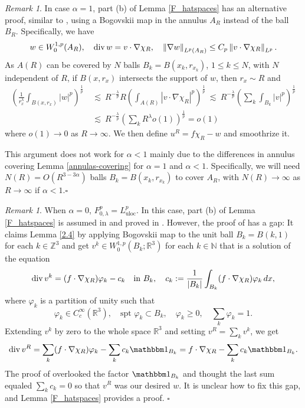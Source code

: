 \documentclass[11pt]{article}
\numberwithin{equation}{section}
\theoremstyle{remark}
\newtheorem{remark}[thm]{Remark}
\theoremstyle{definition}
\newcommand{\bke}[1]{\left ( #1 \right )}
\newcommand{\norm}[1]{\left \| #1 \right \|}
\newcommand{\R}{\mathbb{R}}
\renewcommand{\div}{\mathop{\rm div}\nolimits}
\newcommand{\nb}{\nabla}
\newcommand{\lec}{{\ \lesssim \ }}
\newcommand\al{\alpha}
\newcommand\la{\lambda}
\newcommand{\ZZ}{\mathbb{Z}}
\newcommand{\NN}{\mathbb{N}}
\newcommand{\EQN}[1]{\begin{equation*}\begin{split} #1 \end{split}\end{equation*}}
\newcommand{\uloc}{{\mathrm{uloc}}}
\newcommand{\ph}{\varphi}
\begin{document}
\begin{remark}
%
In case $\al=1$, part (b) of Lemma \ref{F_hatspaces} has an alternative proof, similar to \cite{BK, BKT}, using a Bogovskii map in the annulus $A_R$ instead of the ball $B_R$. Specifically, we have
\[
w\in W^{1,p}_0(A_R),\quad \div w=v\cdot \nb \chi_R,\quad
\norm{\nb w}_{L^p(A_R)}  \le C_p \norm{v\cdot \nb \chi_R}_{L^p}.
\]
As $A(R)$ can be covered by $N$ balls $B_k=B(x_k,r_{x_k})$, $1\le k\le N$, with $N$ independent of $R$,
if $B(x,r_x)$ intersects the support of $w$, then $r_x \sim R$ and
\EQN{
\bke{\frac1{r_x^\la} \int_{B(x,r_x)} |w|^p}^{\frac1p}
&\lec R^{-\frac\la p} R  \bke{\int_{A(R)} |v\cdot \nb \chi_R|^p}^{\frac1p}
\lec R^{-\frac\la p} \bke{ \sum_{k}\int_{B_k} |v|^p}^{\frac1p}
\\
&\lec R^{-\frac\la p} \bke{ \sum_{k} R^\la o(1)}^{\frac1p} = o(1)
}
where $o(1) \to 0$ as $R\to \infty$. We then define $u^R= f \chi_R - w$ and smoothrize it.




This argument
does not work for $\al<1$ mainly due to the differences in annulus covering Lemma \ref{annulas-covering} for $\al=1$ and $\al<1$. Specifically, we will need $N(R) =O(R^{3-3\al})$ balls $B_k= B(x_k, r_{x_k})$ to cover $A_R$, with $N(R) \to \infty$ as $R \to \infty$ if $\al<1$.\hfill $\square$
\end{remark}

\medskip
\begin{remark}
When $\al=0$, $F^p_{0,\la} = L^p_{\uloc}$. In this case, part (b) of Lemma \ref{F_hatspaces} is assumed in \cite{LR} and proved in \cite[Appendix]{KiSe}. However, the proof of \cite{KiSe} has a gap: It claims Lemma \ref{2.4} by applying Bogovskii map to the unit ball $B_k=B(k,1)$ for each $k \in \ZZ^3$ and get
$v^k \in W^{1,p}_0(B_k;\R^3)$ for each $k\in \NN$ that is a solution of the equation%
\[
\div v^k = (f\cdot \nb \chi_R)\ph_k - c_k\quad \text{in }B_k, \quad c_k:=\frac 1{|B_k|}\int_{B_k} (f\cdot \nb \chi_R)\ph_k\,dx,
\]
where $\ph_k$ is a partition of unity such that
\[
\ph_k \in C^\infty_c(\R^3), \quad \text{spt } \ph_k \subset B_k, \quad \ph_k \ge 0, \quad \textstyle \sum_k \ph_k=1.
\]
Extending $v^k$ by zero to the whole space $\R^3$ and setting $v^R = \sum_k v^k$, we get
\[
\div v^R = \sum_k (f\cdot \nb \chi_R)\ph_k -  \sum_k c_k \mathbbm 1_{B_k}= f\cdot \nb \chi_R -\sum_k c_k\mathbbm 1_{B_k}.
\]
The proof of \cite{KiSe} overlooked the factor $\mathbbm 1_{B_k}$ and thought the last sum equaled $\sum_k c_k=0$ so that $v^R$ was our desired $w$. It is unclear how to fix this gap, and Lemma \ref{F_hatspaces} provides a proof.
\hfill $\square$
\end{remark}
\end{document}
